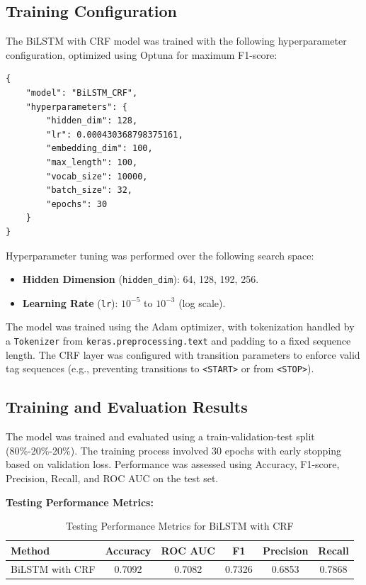\subsection{Training Configuration}

The BiLSTM with CRF model was trained with the following hyperparameter configuration, optimized using Optuna for maximum F1-score:
\begin{verbatim}
{
    "model": "BiLSTM_CRF",
    "hyperparameters": {
        "hidden_dim": 128,
        "lr": 0.000430368798375161,
        "embedding_dim": 100,
        "max_length": 100,
        "vocab_size": 10000,
        "batch_size": 32,
        "epochs": 30
    }
}
\end{verbatim}

Hyperparameter tuning was performed over the following search space:

\begin{itemize}
    \item \textbf{Hidden Dimension} (\texttt{hidden\_dim}): 64, 128, 192, 256.
    \item \textbf{Learning Rate} (\texttt{lr}): $10^{-5}$ to $10^{-3}$ (log scale).
\end{itemize}

The model was trained using the Adam optimizer, with tokenization handled by a \texttt{Tokenizer} from \texttt{keras.preprocessing.text} and padding to a fixed sequence length. The CRF layer was configured with transition parameters to enforce valid tag sequences (e.g., preventing transitions to \texttt{<START>} or from \texttt{<STOP>}).

\subsection{Training and Evaluation Results}

The model was trained and evaluated using a train-validation-test split (80\%-20\%-20\%). The training process involved 30 epochs with early stopping based on validation loss. Performance was assessed using Accuracy, F1-score, Precision, Recall, and ROC AUC on the test set.

\textbf{Testing Performance Metrics:}

\begin{table}[H]
    \centering
    \caption{Testing Performance Metrics for BiLSTM with CRF}
    \label{tab:bilstm-crf-testing-metrics}
    \begin{tabular}{|l|c|c|c|c|c|}
        \hline
        \textbf{Method} & \textbf{Accuracy} & \textbf{ROC AUC} & \textbf{F1} & \textbf{Precision} & \textbf{Recall} \\ 
        \hline
        BiLSTM with CRF & 0.7092 & 0.7082 & 0.7326 & 0.6853 & 0.7868 \\ 
        \hline
    \end{tabular}
\end{table}

